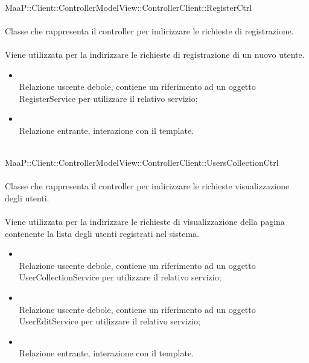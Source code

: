 \\
MaaP::Client::ControllerModelView::ControllerClient::RegisterCtrl\\
\\
Classe che rappresenta il controller per indirizzare le richieste di registrazione.\\
\\
Viene utilizzata per la indirizzare le richieste di registrazione di un nuovo utente.\\
\begin{itemize}
\item{}\\
Relazione uscente debole, contiene un riferimento ad un oggetto RegisterService per utilizzare il relativo servizio;
\item{}\\
Relazione entrante, interazione con il template.
\end{itemize}

\\
MaaP::Client::ControllerModelView::ControllerClient::UsersCollectionCtrl\\
\\
Classe che rappresenta il controller per indirizzare le richieste visualizzazione degli utenti.\\
\\
Viene utilizzata per la indirizzare le richieste di visualizzazione della pagina contenente la lista degli utenti registrati nel sistema.\\
\begin{itemize}
\item{}\\
Relazione uscente debole, contiene un riferimento ad un oggetto UserCollectionService per utilizzare il relativo servizio;
\item{}\\
Relazione uscente debole, contiene un riferimento ad un oggetto UserEditService per utilizzare il relativo servizio;
\item{}\\
Relazione entrante, interazione con il template.
\end{itemize}

